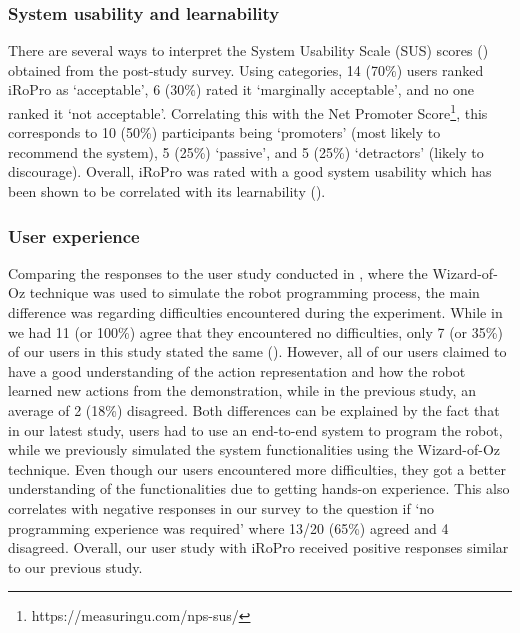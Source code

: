
\subsubsection{System usability and learnability} 
There are several ways to interpret the System Usability Scale (SUS) scores (\cite{brooke2013sus}) obtained from the post-study survey. 
Using \citet{bangor2008suseval} categories, 14 (70\%) users ranked iRoPro as `acceptable', 6 (30\%) rated it `marginally acceptable', and no one ranked it `not acceptable'.
Correlating this with the Net Promoter Score\footnote{https://measuringu.com/nps-sus/}, this corresponds to 10 (50\%) participants being `promoters' (most likely to recommend the system), 5 (25\%) `passive', and 5 (25\%) `detractors' (likely to discourage).
Overall, iRoPro was rated with a good system usability which has been shown to be correlated with its learnability (\cite{borsci2009dimensionality,sauro2011practical}).

\subsubsection{User experience} 
Comparing the responses to the user study conducted in , where the Wizard-of-Oz technique was used to simulate the robot programming process, the main difference was regarding difficulties encountered during the experiment.
While in  we had 11 (or 100\%) agree that they encountered no difficulties, only 7 (or 35\%) of our users in this study stated the same ().
However, all of our users claimed to have a good understanding of the action representation and how the robot learned new actions from the demonstration, while in the previous study, an average of 2 (18\%) disagreed.
Both differences can be explained by the fact that in our latest study, users had to use an end-to-end system to program the robot, while we previously simulated the system functionalities using the Wizard-of-Oz technique.
Even though our users encountered more difficulties, they got a better understanding of the functionalities due to getting hands-on experience.
This also correlates with negative responses in our survey to the question if `no programming experience was required' where 13/20 (65\%) agreed and 4 disagreed.
Overall, our user study with iRoPro received positive responses similar to our previous study.

